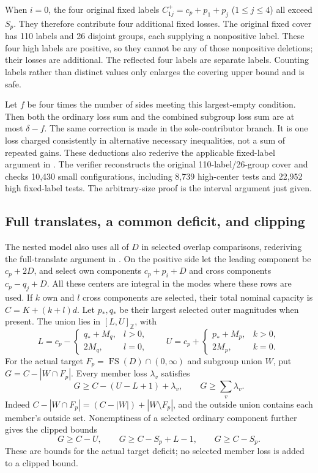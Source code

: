 \documentclass[11pt,a4paper]{article}
\newcommand{\FS}{\operatorname{FS}}
\newcommand{\Z}{\mathbb Z}
\begin{document}
When $i=0$, the four original fixed labels
$C^+_{1j}=c_p+p_1+p_j$ ($1\le j\le4$) all exceed $S_p$.
They therefore contribute four additional fixed losses. The original
fixed cover has 110 labels and 26 disjoint groups, each supplying a
nonpositive label. These four high labels are positive, so they cannot
be any of those nonpositive deletions; their losses are additional.
The reflected four labels are separate labels. Counting labels rather
than distinct values only enlarges the covering upper bound and is safe.

Let $f$ be four times the number of sides meeting this largest-empty
condition. Then both the ordinary loss sum and the combined subgroup
loss sum are at most $\delta-f$. The same correction is made in the
sole-contributor branch. It is one loss charged consistently in alternative
necessary inequalities, not a sum of repeated gains. These deductions
also rederive the applicable fixed-label argument in \cite{archive}.
The verifier reconstructs the original 110-label/26-group cover and
checks 10,430 small configurations, including 8,739 high-center tests
and 22,952 high fixed-label tests. The arbitrary-size proof is the
interval argument just given.

\subsection{Full translates, a common deficit, and clipping}
The nested model also uses all of $D$ in selected overlap comparisons,
rederiving the full-translate argument in \cite{archive}. On the
positive side let the leading component be $c_p+2D$, and select own
components $c_p+p_i+D$ and cross components $c_p-q_j+D$.
All these centers are integral in the modes where these rows are used.
If $k$ own and $l$ cross components are selected, their total nominal
capacity is $C=K+(k+l)d$. Let $p_*,q_*$ be their largest selected
outer magnitudes when present. The union lies in $[L,U]_{\Z}$, with
\[
 L=c_p-\begin{cases}q_*+M_q,&l>0,\\2M_q,&l=0,\end{cases}
 \qquad
 U=c_p+\begin{cases}p_*+M_p,&k>0,\\2M_p,&k=0.\end{cases}
\]
For the actual target $F_p=\FS(D)\cap(0,\infty)$ and subgroup union
$W$, put $G=C-|W\cap F_p|$. Every member loss $\lambda_v$ satisfies
\[
 G\ge C-(U-L+1)+\lambda_v,\qquad G\ge\sum_v\lambda_v.
\]
Indeed $C-|W\cap F_p|=(C-|W|)+|W\setminus F_p|$, and the outside
union contains each member's outside set. Nonemptiness of a selected
ordinary component further gives the clipped bounds
\[
 G\ge C-U,\qquad G\ge C-S_p+L-1,\qquad G\ge C-S_p.
\]
These are bounds for the actual target deficit; no selected member loss
is added to a clipped bound.
\end{document}
